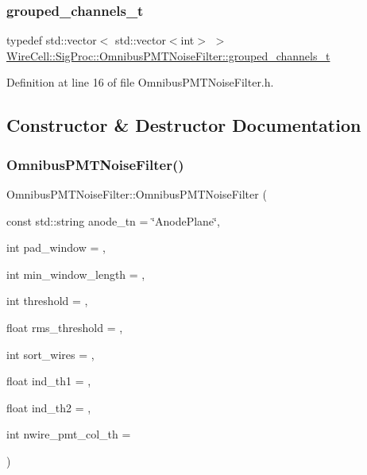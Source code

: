 \subsubsection{\texorpdfstring{grouped\+\_\+channels\+\_\+t}{grouped\_channels\_t}}
{\footnotesize\ttfamily typedef std\+::vector$<$ std\+::vector$<$int$>$ $>$ \hyperlink{class_wire_cell_1_1_sig_proc_1_1_omnibus_p_m_t_noise_filter_a8d4cbd8915593acb3881bfd0d380be66}{Wire\+Cell\+::\+Sig\+Proc\+::\+Omnibus\+P\+M\+T\+Noise\+Filter\+::grouped\+\_\+channels\+\_\+t}}



Definition at line 16 of file Omnibus\+P\+M\+T\+Noise\+Filter.\+h.



\subsection{Constructor \& Destructor Documentation}
\mbox{\label{class_wire_cell_1_1_sig_proc_1_1_omnibus_p_m_t_noise_filter_a84ba13ca4bd78082f7d68110ed60f78d}} 
\subsubsection{\texorpdfstring{Omnibus\+P\+M\+T\+Noise\+Filter()}{OmnibusPMTNoiseFilter()}}
{\footnotesize\ttfamily Omnibus\+P\+M\+T\+Noise\+Filter\+::\+Omnibus\+P\+M\+T\+Noise\+Filter (\begin{DoxyParamCaption}\item[{const std\+::string}]{anode\+\_\+tn = {\ttfamily \char`\"{}AnodePlane\char`\"{}},  }\item[{int}]{pad\+\_\+window = {},  }\item[{int}]{min\+\_\+window\+\_\+length = {},  }\item[{int}]{threshold = {},  }\item[{float}]{rms\+\_\+threshold = {},  }\item[{int}]{sort\+\_\+wires = {},  }\item[{float}]{ind\+\_\+th1 = {},  }\item[{float}]{ind\+\_\+th2 = {},  }\item[{int}]{nwire\+\_\+pmt\+\_\+col\+\_\+th = {} }\end{DoxyParamCaption})}



